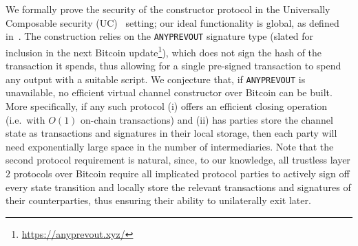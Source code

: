  We formally prove the security of the constructor protocol in the Universally
  Composable security (UC)~\cite{uc} setting; our ideal functionality is global,
  as defined in~\cite{DBLP:conf/tcc/BadertscherCHTZ20}. The
  construction relies on the \texttt{ANYPREVOUT} signature type (slated for
  inclusion in the next Bitcoin update\footnote{\url{https://anyprevout.xyz/}}), which does not sign the hash of the
  transaction it spends, thus allowing for a single pre-signed transaction
  to spend any output with a suitable script. We conjecture that, if
  \texttt{ANYPREVOUT} is unavailable, no efficient virtual channel constructor
  over Bitcoin can be built. More specifically, if any such protocol
  (i) offers an efficient closing operation (i.e.\ with $O(1)$ on-chain
  transactions) and (ii) has parties store the channel state as transactions and
  signatures in their local storage, then each party will need exponentially
  large space in the number of intermediaries. Note that the second protocol
  requirement is natural, since, to our knowledge, all trustless layer $2$
  protocols over Bitcoin require all implicated protocol parties to actively
  sign off every state transition and locally store the relevant transactions
  and signatures of their counterparties, thus ensuring their ability to
  unilaterally exit later.
